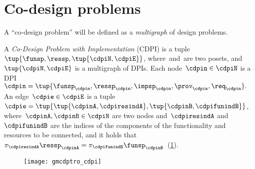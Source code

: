 
\clearpage
\section{Co-design problems}
\label{sec:Co-design-problems}

A ``co-design problem'' will be defined as a \emph{multigraph} of design
problems.
\begin{definition}
    \label{def:cdpi}
    A \emph{Co-Design Problem with Implementation} (CDPI)
    is a tuple~$\tup{\funsp,\ressp,\tup{\cdpiN,\cdpiE}}$,
    where~\funsp and~\ressp are two posets, and~$\tup{ \cdpiN,\cdpiE} $
    is a multigraph of DPIs.
    Each node~$\cdpin\in\cdpiN$ is a
    DPI~$\cdpin=\tup{\funsp_{\cdpin},\ressp_{\cdpin},\impsp_{\cdpin},\prov_{\cdpin},\req_{\cdpin}}.$
    An edge~$\cdpie\in\cdpiE$ is a tuple $\cdpie=\tup{ \tup{ \cdpinA,\cdpiresindA} ,\tup{\cdpinB,\cdpifunindB}}$,
    where~$\cdpinA,\cdpinB\in\cdpiN$ are two nodes and~$\cdpiresindA$
    and~$\cdpifunindB$ are the indices of the components of the functionality
    and resources to be connected, and it holds that~$\pi_{\cdpiresindA}\ressp_{\cdpinA}=\pi_{\cdpifunindB}\funsp_{\cdpinB}$~(\cref{fig:mcdps}).

    \begin{figure}[h]
        \centering
        \texttt{[image: gmcdptro\_cdpi]}
        \caption{\label{fig:mcdps}}
    \end{figure}

\end{definition}

